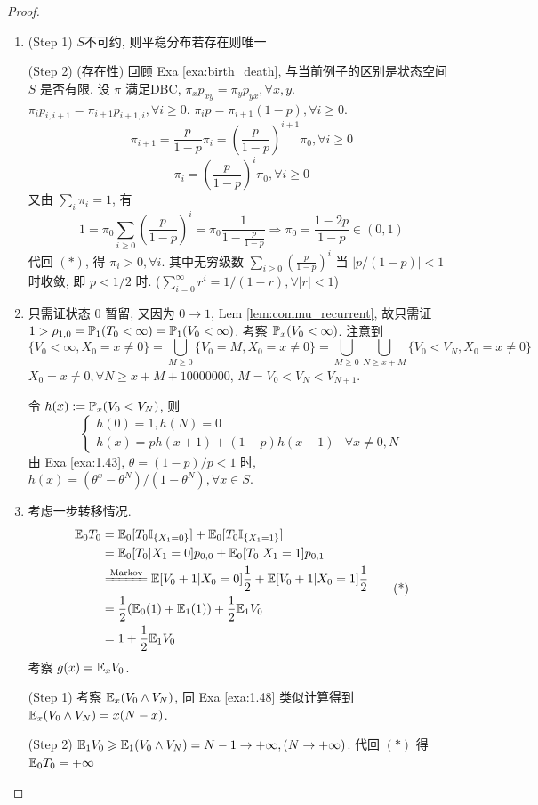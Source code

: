 \begin{proof}
\begin{enumerate}
    \item (Step 1) $S$不可约, 则平稳分布若存在则唯一
    
    (Step 2) (存在性) 回顾 Exa \ref{exa:birth_death}, 与当前例子的区别是状态空间 $S$ 是否有限. 设 $\pi$ 满足DBC, $\pi_xp_{xy}=\pi_yp_{yx},\forall x,y$. $\pi_ip_{i,i+1}=\pi_{i+1}p_{i+1,i},\forall i\geq 0$. $\pi_i p=\pi_{i+1}(1-p),\forall i\geq 0$.
    \[
    \pi_{i+1}=\frac{p}{1-p}\pi_i=\left(\frac{p}{1-p}\right)^{i+1}\pi_0,\forall i\geq 0
    \]
    \[
    \pi_i=\left(\frac{p}{1-p}\right)^{i}\pi_0,\forall i\geq 0\tag{*}
    \]
    又由 $\sum_i \pi_i=1$, 有
    \[
    1=\pi_0\sum_{i\geq 0}\left(\frac{p}{1-p}\right)^i=\pi_0\frac{1}{1-\frac{p}{1-p}}\Rightarrow \pi_0=\frac{1-2p}{1-p}\in (0,1)
    \]
    代回 $(*)$, 得 $\pi_i>0,\forall i$. 其中无穷级数 $\sum_{i\geq 0}\left(\frac{p}{1-p}\right)^i$ 当 $|p/(1-p)|<1$ 时收敛, 即 $p<1/2$ 时. ($\sum_{i=0}^{\infty}r^i=1/(1-r), \forall |r|<1$)
    \item 只需证状态 $0$ 暂留, 又因为 $0\to 1$, Lem \ref{lem:commu_recurrent}, 故只需证 $1>\rho_{1,0}=\mathbb{P}_1(T_0<\infty)=\mathbb{P}_1(V_0<\infty)$. 考察 $\mathbb{P}_x(V_0<\infty)$. 注意到
    \[
    \{V_0<\infty,X_0=x\neq 0\}=\bigcup_{M\geq 0}\{V_0=M,X_0=x\neq 0\}=\bigcup_{M\geq 0}\bigcup_{N\geq x+M}\{V_0<V_N,X_0=x\neq 0\}
    \]
    $X_0=x\neq 0, \forall N\geq x+M+10000000$, $M=V_0<V_N<V_{N+1}$.

    令 $h(x):=\mathbb{P}_x(V_0<V_N)$, 则
    \[
    \begin{cases}
        h(0)=1,h(N)=0\\
        h(x)=ph(x+1)+(1-p)h(x-1) & \forall x\neq 0,N
    \end{cases}
    \]
    由 Exa \ref{exa:1.43}, $\theta=(1-p)/p<1$ 时, $h(x)=(\theta^x-\theta^N)/(1-\theta^N),\forall x\in S$.
    \item 考虑一步转移情况.
    \[
    \begin{aligned}
        \EE_0T_0 &= \EE_0[T_0\II_{\{X_1=0\}}]+\EE_0[T_0\II_{\{X_1=1\}}]\\
        &=\EE_0[T_0|X_1=0]p_{0,0}+\EE_0[T_0|X_1=1]p_{0,1}\\
        &\xlongequal{\text{Markov}}\EE[V_0+1|X_0=0]\frac{1}{2}+\EE[V_0+1|X_0=1]\frac{1}{2}\\
        &=\frac{1}{2}(\EE_0(1)+\EE_1(1))+\frac{1}{2}\EE_1V_0\\
        &=1+\frac{1}{2}\EE_1V_0
    \end{aligned}
    \tag{*}
    \]
    考察 $g(x)=\mathbb E_xV_0$.

    (Step 1) 考察 $\mathbb E_x(V_0\land V_N)$, 同 Exa \ref{exa:1.48} 类似计算得到 $\mathbb E_x(V_0\land V_N)=x(N-x)$.

    (Step 2) $\mathbb E_1V_0\geqslant \mathbb E_1(V_0\land V_N)=N-1\to +\infty, (N\to +\infty)$. 代回 $(*)$ 得 $\mathbb E_0T_0=+\infty$
\end{enumerate}
\end{proof}
\newpage